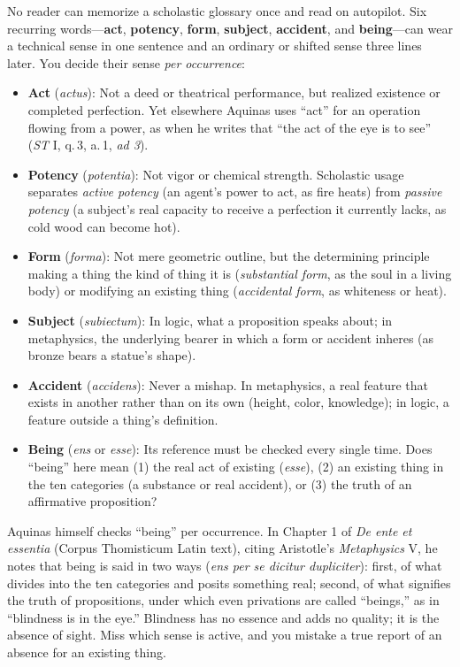 No reader can memorize a scholastic glossary once and read on autopilot. Six recurring words---\textbf{act}, \textbf{potency}, \textbf{form}, \textbf{subject}, \textbf{accident}, and \textbf{being}---can wear a technical sense in one sentence and an ordinary or shifted sense three lines later. You decide their sense \emph{per occurrence}:

\begin{itemize}
\item \textbf{Act} (\emph{actus}): Not a deed or theatrical performance, but realized existence or completed perfection. Yet elsewhere Aquinas uses ``act'' for an operation flowing from a power, as when he writes that ``the act of the eye is to see'' (\emph{ST} I, q.\,3, a.\,1, \emph{ad 3}).
\item \textbf{Potency} (\emph{potentia}): Not vigor or chemical strength. Scholastic usage separates \emph{active potency} (an agent's power to act, as fire heats) from \emph{passive potency} (a subject's real capacity to receive a perfection it currently lacks, as cold wood can become hot).
\item \textbf{Form} (\emph{forma}): Not mere geometric outline, but the determining principle making a thing the kind of thing it is (\emph{substantial form}, as the soul in a living body) or modifying an existing thing (\emph{accidental form}, as whiteness or heat).
\item \textbf{Subject} (\emph{subiectum}): In logic, what a proposition speaks about; in metaphysics, the underlying bearer in which a form or accident inheres (as bronze bears a statue's shape).
\item \textbf{Accident} (\emph{accidens}): Never a mishap. In metaphysics, a real feature that exists in another rather than on its own (height, color, knowledge); in logic, a feature outside a thing's definition.
\item \textbf{Being} (\emph{ens} or \emph{esse}): Its reference must be checked every single time. Does ``being'' here mean (1) the real act of existing (\emph{esse}), (2) an existing thing in the ten categories (a substance or real accident), or (3) the truth of an affirmative proposition?
\end{itemize}

Aquinas himself checks ``being'' per occurrence. In Chapter 1 of \emph{De ente et essentia} (Corpus Thomisticum Latin text), citing Aristotle's \emph{Metaphysics} V, he notes that being is said in two ways (\emph{ens per se dicitur dupliciter}): first, of what divides into the ten categories and posits something real; second, of what signifies the truth of propositions, under which even privations are called ``beings,'' as in ``blindness is in the eye.'' Blindness has no essence and adds no quality; it is the absence of sight. Miss which sense is active, and you mistake a true report of an absence for an existing thing.

